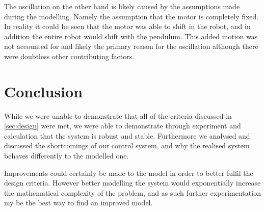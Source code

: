 \documentclass[11pt, a4paper,twocolumn]{article}
\begin{document}
The oscillation on the other hand is likely caused by the assumptions made during the modelling. Namely the assumption that the motor is completely fixed. In reality it could be seen that the motor was able to shift in the robot, and in addition the entire robot would shift with the pendulum. This added motion was not accounted for and likely the primary reason for the oscillation although there were doubtless other contributing factors.

    \section{Conclusion}\label{sec:con}

While we were unable to demonstrate that all of the criteria discussed in \ref{sec:design} were met, we were able to demonstrate through experiment and calculation that the system is robust and stable. Furthermore we analysed and discussed the shortcomings of our control system, and why the realised system behaves differently to the modelled one.

Improvements could certainly be made to the model in order to better fulfil the design criteria. However better modelling the system would exponentially increase the mathematical complexity of the problem, and as such further experimentation my be the best way to find an improved model.
\end{document}
